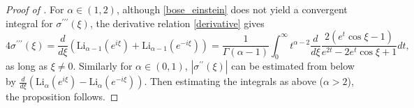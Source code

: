 \documentclass{article}
\numberwithin{equation}{section}
\begin{document}
\begin{proof}[Proof of ]
For $\alpha \in (1,2)$, although \eqref{bose_einstein} does not yield a convergent integral for $\sigma^{\prime\prime\prime}(\xi)$, the derivative relation \eqref{derivative} gives
\begin{equation*}
    4\sigma^{\prime\prime\prime}(\xi) = \frac{d}{d\xi}(\mathrm{Li}_{\alpha-1}(e^{i\xi}) + \mathrm{Li}_{\alpha-1}(e^{-i\xi})) = \frac{1}{\Gamma(\alpha-1)} \int_0^\infty t^{\alpha-2} \frac{d}{d\xi} \frac{2(e^t \cos\xi - 1)}{e^{2t}-2 e^t \cos \xi + 1}dt,
\end{equation*}
as long as $\xi \neq 0$. Similarly for $\alpha \in (0,1)$, $|\sigma^{\prime\prime}(\xi)|$ can be estimated from below by $\frac{d}{d\xi}(\mathrm{Li}_{\alpha}(e^{i\xi}) - \mathrm{Li}_{\alpha}(e^{-i\xi}))$. Then estimating the integrals as above ($\alpha > 2$), the proposition follows.
\end{proof}








\small

\end{document}

